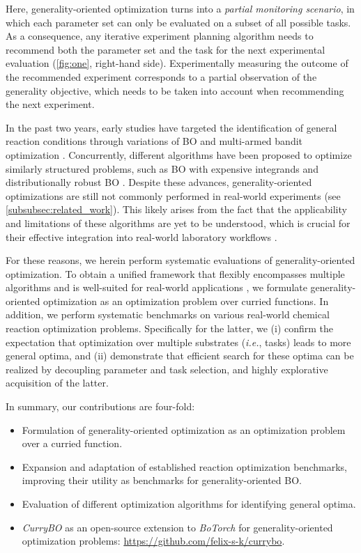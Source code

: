 Here, generality-oriented optimization turns into a \emph{partial monitoring scenario}, in which each parameter set can only be evaluated on a subset of all possible tasks. 
As a consequence, any iterative experiment planning algorithm needs to recommend both the parameter set and the task for the next experimental evaluation (\cref{fig:one}, right-hand side). 
Experimentally measuring the outcome of the recommended experiment corresponds to a partial observation of the generality objective, which needs to be taken into account when recommending the next experiment.

In the past two years, early studies have targeted the identification of general reaction conditions through variations of BO \citep{angello_closed-loop_2022} and multi-armed bandit optimization \citep{wang_identifying_2024}. Concurrently, different algorithms have been proposed to optimize similarly structured problems, such as BO with expensive integrands \citep[BOEI;][]{xie_optimization_2012, toscano-palmerin_bayesian_2018} and distributionally robust BO \citep[DRBO;][]{bogunovic_adversarially_2018, kirschner_distributionally_2020}. Despite these advances, generality-oriented optimizations are still not commonly performed in real-world experiments (see \cref{subsubsec:related_work}).
This likely arises from the fact that the applicability and limitations of these algorithms are yet to be understood, which is crucial for their effective integration into real-world laboratory workflows \citep{tom_self-driving_2024}.

For these reasons, we herein perform systematic evaluations of generality-oriented optimization.
To obtain a unified framework that flexibly encompasses multiple algorithms and is well-suited for real-world applications \citep{betinol_data-driven_2023}, we formulate generality-oriented optimization as an optimization problem over curried functions.
In addition, we perform systematic benchmarks on various real-world chemical reaction optimization problems.
Specifically for the latter, we (i) confirm the expectation that optimization over multiple substrates (\textit{i.e.}, tasks) leads to more general optima, and (ii) demonstrate that efficient search for these optima can be realized by decoupling parameter and task selection, and highly explorative acquisition of the latter.

In summary, our contributions are four-fold: 
\begin{itemize}[itemsep=0em, topsep=0em]
    \item Formulation of generality-oriented optimization as an optimization problem over a curried function.
    \item Expansion and adaptation of established reaction optimization benchmarks, improving their utility as benchmarks for generality-oriented BO.
    \item Evaluation of different optimization algorithms for identifying general optima.
    \item \textit{CurryBO} as an open-source extension to \textit{BoTorch} \citep{balandat_botorch_2020} for generality-oriented optimization problems: \href{https://github.com/felix-s-k/currybo}{https://github.com/felix-s-k/currybo}.
\end{itemize}